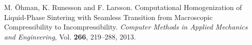 \documentclass{Eccomas}
\begin{document}
\begin{thebibliography}{99}
\setlength{\parskip}{0pt}


 M. \"Ohman, K. Runesson and F. Larsson. Computational Homogenization of Liquid-Phase Sintering with Seamless Transition from Macroscopic Compressibility to Incompressibility.
{\em Computer Methods in Applied Mechanics and Engineering}, Vol. {\bf 266}, 219--288, 2013.



\end{thebibliography}
\end{document}
